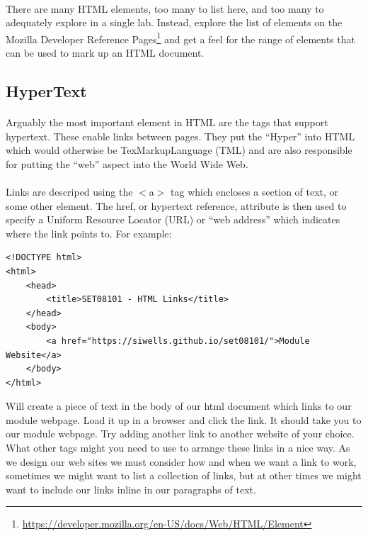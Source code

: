 \documentclass[10pt, a4paper, twosize]{article}
\begin{document}
\paragraph{} There are many HTML elements, too many to list here, and too many to adequately explore in a single lab. Instead, explore the list of elements on the Mozilla Developer Reference Pages\footnote{\url{https://developer.mozilla.org/en-US/docs/Web/HTML/Element}} and get a feel for the range of elements that can be used to mark up an HTML document.

\subsection{HyperText}
\paragraph{} Arguably the most important element in HTML are the tags that support hypertext. These enable links between pages. They put the ``Hyper'' into HTML which would otherwise be TexMarkupLanguage (TML) and are also responsible for putting the ``web'' aspect into the World Wide Web.

\paragraph{} Links are descriped using the $<$a$>$ tag which encloses a section of text, or some other element. The href, or hypertext reference, attribute is then used to specify a Uniform Resource Locator (URL) or ``web address'' which indicates where the link points to. For example:

\begin{lstlisting}
<!DOCTYPE html>
<html>
    <head>
        <title>SET08101 - HTML Links</title>
    </head>
    <body>
        <a href="https://siwells.github.io/set08101/">Module Website</a>        
    </body>
</html>
\end{lstlisting}
Will create a piece of text in the body of our html document which links to our module webpage. Load it up in a browser and click the link. It should take you to our module webpage. Try adding another link to another website of your choice. What other tags might you need to use to arrange these links in a nice way. As we design our web sites we must consider how and when we want a link to work, sometimes we might want to list a collection of links, but at other times we might want to include our links inline in our paragraphs of text.
\end{document}

